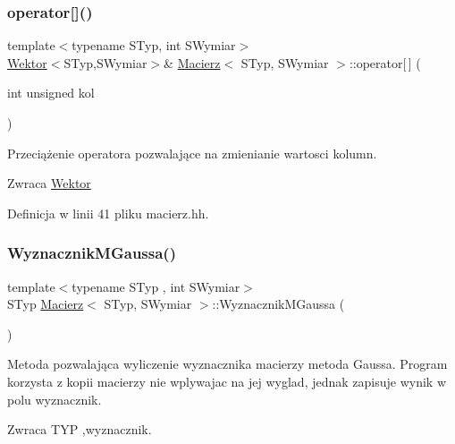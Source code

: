 \subsubsection{\texorpdfstring{operator[]()}{operator[]()}\hspace{0.1cm}{\footnotesize\ttfamily [2/2]}}
{\footnotesize\ttfamily template$<$typename S\+Typ, int S\+Wymiar$>$ \\
\mbox{\hyperlink{class_wektor}{Wektor}}$<$S\+Typ,S\+Wymiar$>$\& \mbox{\hyperlink{class_macierz}{Macierz}}$<$ S\+Typ, S\+Wymiar $>$\+::operator\mbox{[}$\,$\mbox{]} (\begin{DoxyParamCaption}\item[{int unsigned}]{kol }\end{DoxyParamCaption})\hspace{0.3cm}{\ttfamily [inline]}}

Przeciążenie operatora pozwalające na zmienianie wartosci kolumn.

\begin{DoxyReturn}{Zwraca}
\mbox{\hyperlink{class_wektor}{Wektor}} 
\end{DoxyReturn}


Definicja w linii 41 pliku macierz.\+hh.

\mbox{\label{class_macierz_ab481b30cfb31616ce940756a6c32086f}} 
\subsubsection{\texorpdfstring{WyznacznikMGaussa()}{WyznacznikMGaussa()}}
{\footnotesize\ttfamily template$<$typename S\+Typ , int S\+Wymiar$>$ \\
S\+Typ \mbox{\hyperlink{class_macierz}{Macierz}}$<$ S\+Typ, S\+Wymiar $>$\+::Wyznacznik\+M\+Gaussa (\begin{DoxyParamCaption}{ }\end{DoxyParamCaption})}

Metoda pozwalająca wyliczenie wyznacznika macierzy metoda Gaussa. Program korzysta z kopii macierzy nie wplywajac na jej wyglad, jednak zapisuje wynik w polu wyznacznik.

\begin{DoxyReturn}{Zwraca}
T\+YP ,wyznacznik. 
\end{DoxyReturn}


